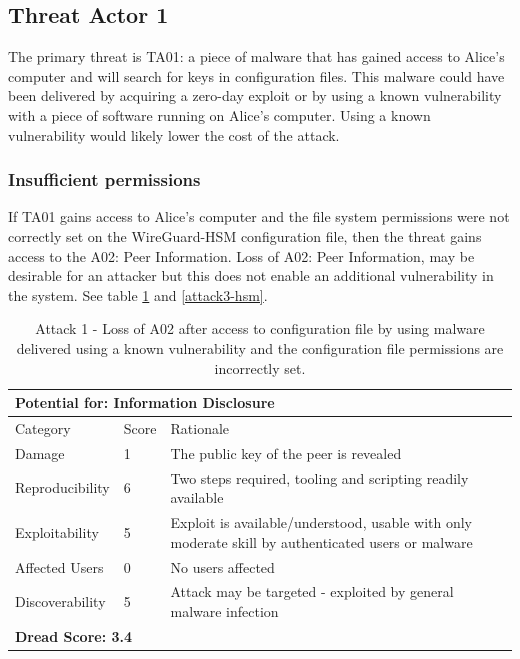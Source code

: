 \documentclass [11pt, proquest] {uwthesis}[2020/02/24]
\begin{document}
\subsection{Threat Actor 1}
The primary threat is TA01: a piece of malware that has gained access to Alice's computer and will search for keys in configuration files. This malware could have been delivered by acquiring a zero-day exploit or by using a known vulnerability with a piece of software running on Alice's computer. Using a known vulnerability would likely lower the cost of the attack.

\subsubsection{Insufficient permissions}
If TA01 gains access to Alice's computer and the file system permissions were not correctly set on the WireGuard-HSM configuration file, then the threat gains access to the A02: Peer Information. Loss of A02: Peer Information, may be desirable for an attacker but this does not enable an additional vulnerability in the system.
See table \ref{attack1-hsm} and \ref{attack3-hsm}.

\begin{table}[H]
\label{attack1-hsm}
\begin{tabular}{|m{3cm}|m{.9cm}|p{27em} |}
\multicolumn{3}{l}{Potential for: Information Disclosure}                   \\
\hline
Category & Score & Rationale                                                    \\
\hline
Damage          & 1     & The public key of the peer is revealed            \\
\hline
Reproducibility & 6     & Two steps required, tooling and scripting readily available    \\
\hline
Exploitability & 5      & Exploit is available/understood, usable with only moderate skill by authenticated users or malware \\
\hline
Affected Users  & 0     & No users affected             \\
\hline
Discoverability & 5     & Attack may be targeted - exploited by general malware infection \\
\hline
\multicolumn{3}{l}{\textbf{Dread Score: 3.4}} 
\end{tabular}
\caption{Attack 1 - Loss of A02 after access to configuration file by using malware delivered using a known vulnerability and the configuration file permissions are incorrectly set.}
\end{table}
\end{document}
